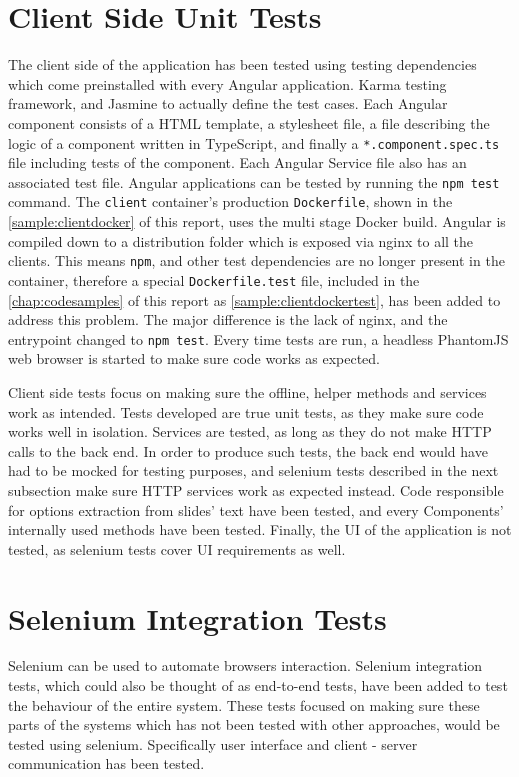 \section{Client Side Unit Tests}
The client side of the application has been tested using testing dependencies which come
preinstalled with every Angular application. Karma\cite{63} testing framework, and
Jasmine\cite{64} to actually define the test cases. Each Angular component consists of a HTML
template, a stylesheet file, a file describing the logic of a component written in TypeScript,
and finally a \texttt{*.component.spec.ts} file including tests of the component. Each Angular
Service file also has an associated test file. Angular applications can be tested by running
the \texttt{npm test} command. The \texttt{client} container's production \texttt{Dockerfile}, shown
in the \autoref{sample:clientdocker} of this report, uses the multi stage Docker build. Angular is compiled down to
a distribution folder which is exposed via nginx to all the clients. This means \texttt{npm},
and other test dependencies are no longer present in the container, therefore a special \texttt{Dockerfile.test}
file, included in the \autoref{chap:codesamples} of this report as \autoref{sample:clientdockertest},
has been added to address this problem. The major difference is the lack of nginx, and the entrypoint
changed to \texttt{npm test}. Every time tests are run, a headless PhantomJS\cite{65} web browser
is started to make sure code works as expected.

Client side tests focus on making sure the offline, helper methods and services work as intended.
Tests developed are true unit tests, as they make sure code works well in isolation. Services
are tested, as long as they do not make HTTP calls to the back end. In order to produce such
tests, the back end would have had to be mocked for testing purposes, and selenium\cite{66} tests described
in the next subsection make sure HTTP services work as expected instead. Code responsible for
options extraction from slides' text have been tested, and every Components' internally
used methods have been tested. Finally, the UI of the application is not tested, as selenium
tests cover UI requirements as well.

\section{Selenium Integration Tests}
Selenium can be used to automate browsers interaction. Selenium integration tests,
which could also be thought of as end-to-end tests, have been added to test
the behaviour of the entire system. These tests focused on making sure these parts
of the systems which has not been tested with other approaches, would be tested
using selenium. Specifically user interface and client - server communication
has been tested.


